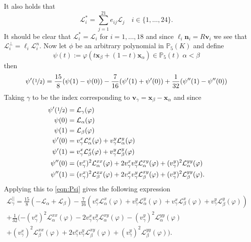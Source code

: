 It also holds that
\begin{equation}
  \mathcal{L}^*_i = \sum_{j=1}^{21} e_{ij} \mathcal{L}_j \quad i\in
  \{1,\dots,24\}.
  \label{eqn:FunctionalsE}
\end{equation}
It should be clear that $\mathcal{L}^*_i = \mathcal{L}_i$ for $i=1,\dots,18$
and since $\ell_i \mathbf{n}_i = R \mathbf{v}_i$ we see that $\mathcal{L}^{\perp}_i =
\ell_i \mathcal{L}^n_i$. Now let $\phi$ be an arbitrary polynomial in
$\mathbb{P}_5(K)$ and define
\begin{equation*}
  \psi(t) := \varphi(t\mathbf{x}_{\beta} + (1-t)\mathbf{x}_{\alpha}) \in
  \mathbb{P}_5(t) \; \alpha<\beta
\end{equation*}
then
\begin{equation}
  \psi'(\nicefrac{1}{2}) = \frac{15}{8} (\psi(1)-\psi(0)) -
  \frac{7}{16} (\psi'(1)+\psi'(0)) + \frac{1}{32} (\psi''(1)-\psi''(0))
  \label{eqn:Psi}
\end{equation}
Taking $\gamma$ to be the index corresponding to $\mathbf{v}_{\gamma} =
\mathbf{x}_{\beta} - \mathbf{x}_{\alpha}$ and since
\begin{align*}
  \psi'(\nicefrac{1}{2}) &= \mathcal{L}_{\gamma}(\varphi) \\
  \psi(0) &= \mathcal{L}_{\alpha}(\varphi) \\
  \psi(1) &= \mathcal{L}_{\beta}(\varphi) \\
  \psi'(0) &= v^x_{\gamma}\mathcal{L}^x_{\alpha}(\varphi) +
    v^y_{\gamma}\mathcal{L}^y_{\alpha}(\varphi) \\
  \psi'(1) &= v^x_{\gamma}\mathcal{L}^x_{\beta}(\varphi) +
    v^y_{\gamma}\mathcal{L}^y_{\beta}(\varphi) \\
  \psi''(0) &= (v^x_{\gamma})^2\mathcal{L}^{xx}_{\alpha}(\varphi) +
    2 v^x_{\gamma}v^y_{\gamma}\mathcal{L}^{xy}_{\alpha}(\varphi) + 
    (v^y_{\gamma})^2\mathcal{L}^{yy}_{\alpha}(\varphi) \\
  \psi''(1) &= (v^x_{\gamma})^2\mathcal{L}^{xx}_{\beta}(\varphi) +
    2 v^x_{\gamma}v^y_{\gamma}\mathcal{L}^{xy}_{\beta}(\varphi) + 
    (v^y_{\gamma})^2\mathcal{L}^{yy}_{\beta}(\varphi).
\end{align*}
Applying this to \eqref{eqn:Psi} gives the following expression
\begin{equation*}
  \begin{split}
    \mathcal{L}^{||}_{\gamma} = \frac{15}{8}(-\mathcal{L}_{\alpha} +
      \mathcal{L}_{\beta}) 
    - \frac{7}{16} ( v^x_{\gamma}\mathcal{L}^x_{\alpha}(\varphi) +
      v^y_{\gamma}\mathcal{L}^y_{\alpha}(\varphi) + 
      v^x_{\gamma}\mathcal{L}^x_{\beta}(\varphi) +
      v^y_{\gamma}\mathcal{L}^y_{\beta}(\varphi)) 
      \\ 
    + \frac{1}{32}(-(v^x_{\gamma})^2\mathcal{L}^{xx}_{\alpha}(\varphi) -
      2 v^x_{\gamma}v^y_{\gamma}\mathcal{L}^{xy}_{\alpha}(\varphi) - 
      (v^y_{\gamma})^2\mathcal{L}^{yy}_{\alpha}(\varphi) \\
      + (v^x_{\gamma})^2\mathcal{L}^{xx}_{\beta}(\varphi) +
      2 v^x_{\gamma}v^y_{\gamma}\mathcal{L}^{xy}_{\beta}(\varphi) + 
      (v^y_{\gamma})^2\mathcal{L}^{yy}_{\beta}(\varphi)).
  \end{split}
\end{equation*}
